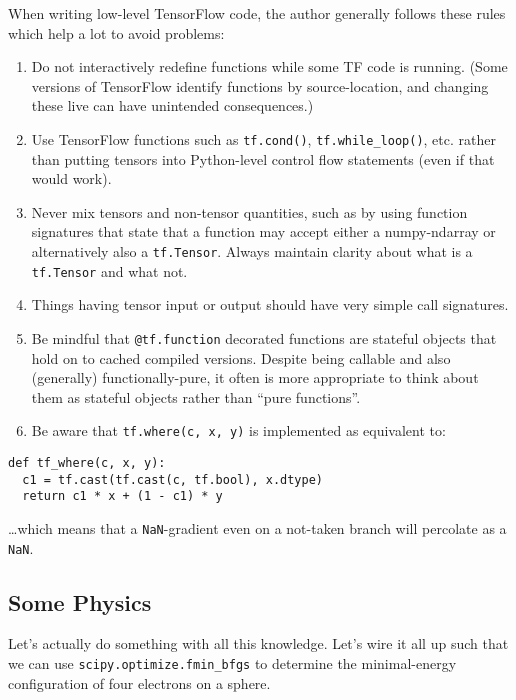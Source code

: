 \documentclass[11pt]{article}
\begin{document}
    When writing low-level TensorFlow code, the author generally follows
these rules which help a lot to avoid problems:

\begin{enumerate}
\def\labelenumi{\arabic{enumi}.}
\item
  Do not interactively redefine functions while some TF code is running.
  (Some versions of TensorFlow identify functions by source-location,
  and changing these live can have unintended consequences.)
\item
  Use TensorFlow functions such as \texttt{tf.cond()},
  \texttt{tf.while\_loop()}, etc. rather than putting tensors into
  Python-level control flow statements (even if that would work).
\item
  Never mix tensors and non-tensor quantities, such as by using function
  signatures that state that a function may accept either a
  numpy-ndarray or alternatively also a \texttt{tf.Tensor}. Always
  maintain clarity about what is a \texttt{tf.Tensor} and what not.
\item
  Things having tensor input or output should have very simple call
  signatures.
\item
  Be mindful that \texttt{@tf.function} decorated functions are stateful
  objects that hold on to cached compiled versions. Despite being
  callable and also (generally) functionally-pure, it often is more
  appropriate to think about them as stateful objects rather than ``pure
  functions''.
\item
  Be aware that \texttt{tf.where(c,\ x,\ y)} is implemented as
  equivalent to:
\end{enumerate}

\begin{verbatim}
def tf_where(c, x, y):
  c1 = tf.cast(tf.cast(c, tf.bool), x.dtype)
  return c1 * x + (1 - c1) * y
\end{verbatim}

\ldots which means that a \texttt{NaN}-gradient even on a not-taken
branch will percolate as a \texttt{NaN}.

    \hypertarget{some-physics}{%
\subsection{Some Physics}\label{some-physics}}

Let's actually do something with all this knowledge. Let's wire it all
up such that we can use \texttt{scipy.optimize.fmin\_bfgs} to determine
the minimal-energy configuration of four electrons on a sphere.
\end{document}
